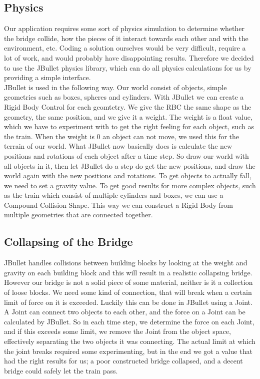 \subsection{Physics}
Our application requires some sort of physics simulation to determine whether the bridge collide, how the pieces of it interact towards each other and with the environment, etc. Coding a solution ourselves would be very difficult, require a lot of work, and would probably have disappointing results. Therefore we decided to use the JBullet physics library, which can do all physics calculations for us by providing a simple interface. \\
JBullet is used in the following way. Our world consist of objects, simple geometries such as boxes, spheres and cylinders. With JBullet we can create a Rigid Body Control for each geomtetry. We give the RBC the same shape as the geometry, the same position, and we give it a weight. The weight is a float value, which we have to experiment with to get the right feeling for each object, such as the train. When the weight is 0 an object can not move, we used this for the terrain of our world. What JBullet now basically does is calculate the new positions and rotations of each object after a time step. So draw our world with all objects in it, then let JBullet do a step do get the new positions, and draw the world again with the new positions and rotations. To get objects to actually fall, we need to set a gravity value. To get good results for more complex objects, such as the train which consist of multiple cylinders and boxes, we can use a Compound Collision Shape. This way we can construct a Rigid Body from multiple geometries that are connected together. 
\subsection{Collapsing of the Bridge}
JBullet handles collisions between building blocks by looking at the weight and gravity on each building block and this will result in a realistic collapsing bridge. However our bridge is not a solid piece of some material, neither is it a collection of loose blocks. We need some kind of connection, that will break when a certain limit of force on it is exceeded. Luckily this can be done in JBullet using a Joint. A Joint can connect two objects to each other, and the force on a Joint can be calculated by JBullet. So in each time step, we determine the force on each Joint, and if this exceeds some limit, we remove the Joint from the object space, effectively separating the two objects it was connecting. The actual limit at which the joint breaks required some experimenting, but in the end we got a value that had the right results for us; a poor constructed bridge collapsed, and a decent bridge could safely let the train pass.
